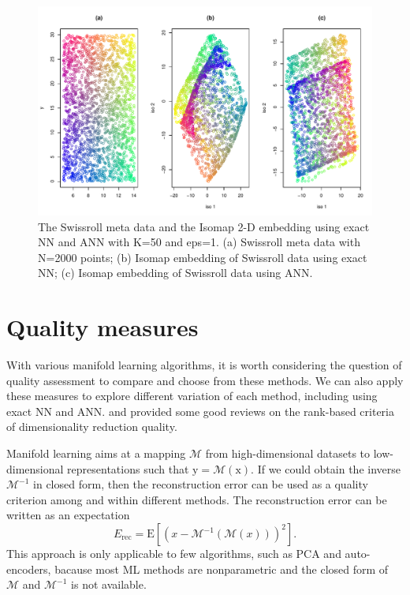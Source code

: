 \documentclass[11pt,a4paper,]{article}
\begin{document}
\begin{figure}

{\centering \includegraphics[width=1\linewidth]{Simulation_files/figure-latex/mapping-1} 

}

\caption{The Swissroll meta data and the Isomap 2-D embedding using exact NN and ANN with K=50 and eps=1. (a) Swissroll meta data with N=2000 points; (b) Isomap embedding of Swissroll data using exact NN; (c) Isomap embedding of Swissroll data using ANN.}\label{fig:mapping}
\end{figure}

\hypertarget{quality-measures}{%
\section{Quality measures}\label{quality-measures}}

With various manifold learning algorithms, it is worth considering the question of quality assessment to compare and choose from these methods. We can also apply these measures to explore different variation of each method, including using exact NN and ANN. \textcite{Lee2008-cx} and \textcite{Gracia2014-ae} provided some good reviews on the rank-based criteria of dimensionality reduction quality.

Manifold learning aims at a mapping \(\mathcal{M}\) from high-dimensional datasets to low-dimensional representations such that \(\mathrm{y} = \mathcal{M}(\mathrm{x})\). If we could obtain the inverse \(\mathcal{M}^{-1}\) in closed form, then the reconstruction error can be used as a quality criterion among and within different methods. The reconstruction error can be written as an expectation
\[
E_{\mathrm{rec}}=\mathrm{E}\left[ \left(x-\mathcal{M}^{-1}(\mathcal{M}(x))\right)^{2} \right].
\]
This approach is only applicable to few algorithms, such as PCA and auto-encoders, bacause most ML methods are nonparametric and the closed form of \(\mathcal{M}\) and \(\mathcal{M}^{-1}\) is not available.
\end{document}
